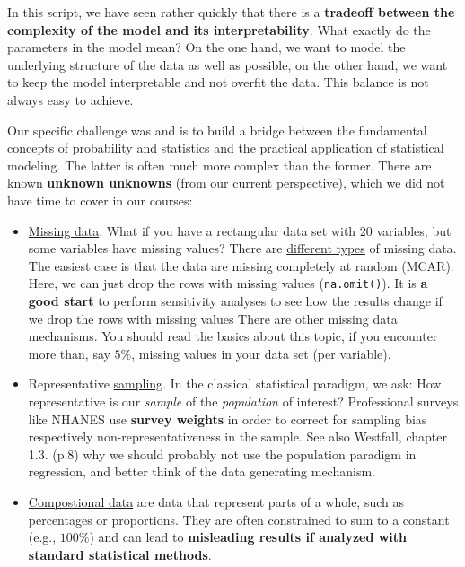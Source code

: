 \documentclass[
]{book}
\begin{document}
In this script, we have seen rather quickly that there is a \textbf{tradeoff between the complexity of
the model and its interpretability}. What exactly do the parameters in the model mean?
On the one hand, we want to model
the underlying structure of the data as well as possible,
on the other hand, we want to keep the model interpretable and not overfit the data.
This balance is not always easy to achieve.

Our specific challenge was and is to build a bridge between the fundamental concepts
of probability and statistics and the practical application of statistical modeling.
The latter is often much more complex than the former.
There are known \textbf{unknown unknowns} (from our current perspective), which we did not have time to cover in our courses:

\begin{itemize}
\item
  \href{https://en.wikipedia.org/wiki/Missing_data}{Missing data}.
  What if you have a rectangular data set with 20 variables,
  but some variables have missing values?
  There are \href{https://en.wikipedia.org/wiki/Missing_data\#Types}{different types}
  of missing data. The easiest case is that the data are missing completely at random (MCAR).
  Here, we can just drop the rows with missing values (\texttt{na.omit()}).
  It is \textbf{a good start} to perform sensitivity analyses to see how the results change
  if we drop the rows with missing values
  There are other missing data mechanisms. You should read the basics about this topic,
  if you encounter more than, say \(5\%\), missing values in your data set (per variable).
\item
  Representative \href{https://en.wikipedia.org/wiki/Sampling_(statistics)}{sampling}.
  In the classical statistical paradigm, we ask: How representative is our \emph{sample} of the \emph{population} of interest?
  Professional surveys like NHANES use \textbf{survey weights} in order to correct for
  sampling bias respectively non-representativeness in the sample.
  See also Westfall, chapter 1.3. (p.8) why we should probably not use the population paradigm in regression,
  and better think of the data generating mechanism.
\item
  \href{https://en.wikipedia.org/wiki/Compositional_data}{Compostional data}
  are data that represent parts of a whole, such as percentages or proportions.
  They are often constrained to sum to a constant (e.g., \(100\%\)) and can
  lead to \textbf{misleading results if analyzed with standard statistical methods}.

\end{itemize}
\end{document}
